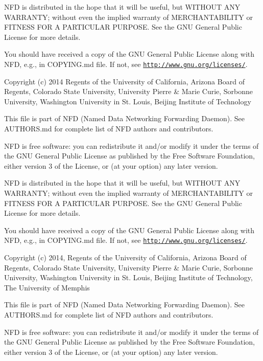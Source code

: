 N\+FD is distributed in the hope that it will be useful, but W\+I\+T\+H\+O\+UT A\+NY W\+A\+R\+R\+A\+N\+TY; without even the implied warranty of M\+E\+R\+C\+H\+A\+N\+T\+A\+B\+I\+L\+I\+TY or F\+I\+T\+N\+E\+SS F\+OR A P\+A\+R\+T\+I\+C\+U\+L\+AR P\+U\+R\+P\+O\+SE. See the G\+NU General Public License for more details.

You should have received a copy of the G\+NU General Public License along with N\+FD, e.\+g., in C\+O\+P\+Y\+I\+N\+G.\+md file. If not, see \href{http://www.gnu.org/licenses/}{\tt http\+://www.\+gnu.\+org/licenses/}.

Copyright (c) 2014 Regents of the University of California, Arizona Board of Regents, Colorado State University, University Pierre \& Marie Curie, Sorbonne University, Washington University in St. Louis, Beijing Institute of Technology

This file is part of N\+FD (Named Data Networking Forwarding Daemon). See A\+U\+T\+H\+O\+R\+S.\+md for complete list of N\+FD authors and contributors.

N\+FD is free software\+: you can redistribute it and/or modify it under the terms of the G\+NU General Public License as published by the Free Software Foundation, either version 3 of the License, or (at your option) any later version.

N\+FD is distributed in the hope that it will be useful, but W\+I\+T\+H\+O\+UT A\+NY W\+A\+R\+R\+A\+N\+TY; without even the implied warranty of M\+E\+R\+C\+H\+A\+N\+T\+A\+B\+I\+L\+I\+TY or F\+I\+T\+N\+E\+SS F\+OR A P\+A\+R\+T\+I\+C\+U\+L\+AR P\+U\+R\+P\+O\+SE. See the G\+NU General Public License for more details.

You should have received a copy of the G\+NU General Public License along with N\+FD, e.\+g., in C\+O\+P\+Y\+I\+N\+G.\+md file. If not, see \href{http://www.gnu.org/licenses/}{\tt http\+://www.\+gnu.\+org/licenses/}.

Copyright (c) 2014, Regents of the University of California, Arizona Board of Regents, Colorado State University, University Pierre \& Marie Curie, Sorbonne University, Washington University in St. Louis, Beijing Institute of Technology, The University of Memphis

This file is part of N\+FD (Named Data Networking Forwarding Daemon). See A\+U\+T\+H\+O\+R\+S.\+md for complete list of N\+FD authors and contributors.

N\+FD is free software\+: you can redistribute it and/or modify it under the terms of the G\+NU General Public License as published by the Free Software Foundation, either version 3 of the License, or (at your option) any later version.

